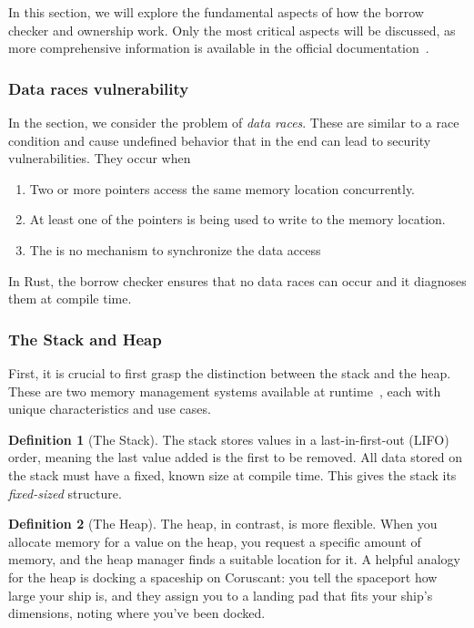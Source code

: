 \documentclass[11pt]{report}
\theoremstyle{definition}
\newtheorem{definition}{Definition}[section]
\theoremstyle{plain}
\begin{document}
In this section, we will explore the fundamental aspects of how the borrow checker and ownership work. Only the most critical aspects will be discussed, as more comprehensive information is available in the official documentation~\cite{rustlangRustProgramming}.

\subsubsection{Data races vulnerability}
In the section, we consider the problem of \textit{data races}. These are similar to a race condition and cause undefined behavior that in the end can lead to security vulnerabilities. They occur when
\begin{enumerate}[parsep=0pt, itemsep=0pt]
  \item Two or more pointers access the same memory location concurrently.
  \item At least one of the pointers is being used to write to the memory location.
  \item The is no mechanism to synchronize the data access
\end{enumerate}
In Rust, the borrow checker ensures that no data races can occur and it diagnoses them at compile time.

\subsubsection{The Stack and Heap}
First, it is crucial to first grasp the distinction between the stack and the heap. These are two memory management systems available at runtime~\cite[ch.4]{rustlangRustProgramming}, each with unique characteristics and use cases.

\begin{definition}[The Stack]
  The stack stores values in a last-in-first-out (LIFO) order, meaning the last value added is the first to be removed. All data stored on the stack must have a fixed, known size at compile time. This gives the stack its \textit{fixed-sized} structure.
\end{definition}

\begin{definition}[The Heap]
  The heap, in contrast, is more flexible. When you allocate memory for a value on the heap, you request a specific amount of memory, and the heap manager finds a suitable location for it. A helpful analogy for the heap is docking a spaceship on Coruscant: you tell the spaceport how large your ship is, and they assign you to a landing pad that fits your ship's dimensions, noting where you've been docked.
\end{definition}
\end{document}
